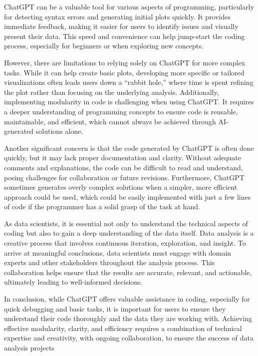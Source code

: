 \documentclass[
]{article}
\begin{document}
ChatGPT can be a valuable tool for various aspects of programming,
particularly for detecting syntax errors and generating initial plots
quickly. It provides immediate feedback, making it easier for users to
identify issues and visually present their data. This speed and
convenience can help jump-start the coding process, especially for
beginners or when exploring new concepts.

However, there are limitations to relying solely on ChatGPT for more
complex tasks. While it can help create basic plots, developing more
specific or tailored visualizations often leads users down a ``rabbit
hole,'' where time is spent refining the plot rather than focusing on
the underlying analysis. Additionally, implementing modularity in code
is challenging when using ChatGPT. It requires a deeper understanding of
programming concepts to ensure code is reusable, maintainable, and
efficient, which cannot always be achieved through AI-generated
solutions alone.

Another significant concern is that the code generated by ChatGPT is
often done quickly, but it may lack proper documentation and clarity.
Without adequate comments and explanations, the code can be difficult to
read and understand, posing challenges for collaboration or future
revisions. Furthermore, ChatGPT sometimes generates overly complex
solutions when a simpler, more efficient approach could be used, which
could be easily implemented with just a few lines of code if the
programmer has a solid grasp of the task at hand.

As data scientists, it is essential not only to understand the technical
aspects of coding but also to gain a deep understanding of the data
itself. Data analysis is a creative process that involves continuous
iteration, exploration, and insight. To arrive at meaningful
conclusions, data scientists must engage with domain experts and other
stakeholders throughout the analysis process. This collaboration helps
ensure that the results are accurate, relevant, and actionable,
ultimately leading to well-informed decisions.

In conclusion, while ChatGPT offers valuable assistance in coding,
especially for quick debugging and basic tasks, it is important for
users to ensure they understand their code thoroughly and the data they
are working with. Achieving effective modularity, clarity, and
efficiency requires a combination of technical expertise and creativity,
with ongoing collaboration, to ensure the success of data analysis
projects
\end{document}
